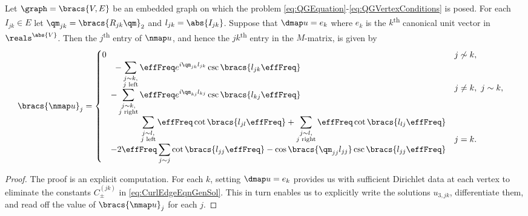 \begin{prop} \label{prop:M-MatrixEntries}
	Let $\graph=\bracs{V,E}$ be an embedded graph on which the problem \eqref{eq:QGEquation}-\eqref{eq:QGVertexConditions} is posed.
	For each $I_{jk}\in E$ let $\qm_{jk} = \bracs{R_{jk}\qm}_2$ and $l_{jk} = \abs{I_{jk}}$.
	Suppose that $\dmap u = e_k$ where $e_k$ is the $k$\textsuperscript{th} canonical unit vector in $\reals^{\abs{V}}$.
	Then the $j$\textsuperscript{th} entry of $\nmap u$, and hence the $jk$\textsuperscript{th} entry in the $M$-matrix, is given by 
	\begin{align*}
		\bracs{\nmap u}_j &= 
		\begin{cases}
			\!\begin{aligned}
				0	
			\end{aligned}			
			& j \not\sim k, \\
			\!\begin{aligned}
				-\sum_{\substack{j\sim k, \\ j \text{ left}}} \effFreq e^{i\qm_{jk}l_{jk}} \csc\bracs{l_{jk}\effFreq} 
				\\ \quad - \sum_{\substack{j\sim k, \\ j \text{ right}}} \effFreq e^{i\qm_{kj}l_{kj}} \csc\bracs{l_{kj}\effFreq}
			\end{aligned}
			& j\neq k, \ j\sim k, \\
			\!\begin{aligned}
				\sum_{\substack{j\sim l, \\ j \text{ left}}} \effFreq\cot\bracs{l_{jl}\effFreq}
				+ \sum_{\substack{j\sim l, \\ j \text{ right}}} \effFreq\cot\bracs{l_{lj}\effFreq}
				\\ \quad - 2\effFreq\sum_{j\sim j} \cot\bracs{l_{jj}\effFreq} - \cos\bracs{\qm_{jj}l_{jj}}\csc\bracs{l_{jj}\effFreq}
			\end{aligned}
			& j=k.
		\end{cases}
	\end{align*}
\end{prop}
\begin{proof}
	The proof is an explicit computation. 
	For each $k$, setting $\dmap u = e_k$ provides us with sufficient Dirichlet data at each vertex to eliminate the constants $C^{(jk)}_{\pm}$ in \eqref{eq:CurlEdgeEqnGenSol}.
	This in turn enables us to explicitly write the solutions $u_{3,jk}$, differentiate them, and read off the value of $\bracs{\nmap u}_j$ for each $j$.
\end{proof}

